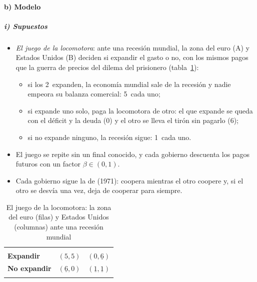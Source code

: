 \documentclass[11pt]{article}
\begin{document}
\paragraph{b) Modelo}
\subparagraph{i) Supuestos}
\begin{itemize}
\item \emph{El juego de la locomotora}\nocite{Frankel2016Coordination}: ante una recesión mundial, la zona del euro (A) y Estados Unidos (B) deciden si expandir el gasto o no, con los mismos pagos que la guerra de precios del dilema del prisionero  (tabla~\ref{tab:locomotora}):
  \begin{itemize}
  \item si los 2~expanden, la economía mundial sale de la recesión y nadie empeora su balanza comercial: 5~cada uno;
  \item si expande uno solo, paga la locomotora de otro: el que expande se queda con el déficit y la deuda (0) y el otro se lleva el tirón sin pagarlo (6);
  \item si no expande ninguno, la recesión sigue: 1~cada uno.
  \end{itemize}
\item El juego se repite sin un final conocido, y cada gobierno descuenta los pagos futuros con un factor $\beta\in(0,1)$.
\item Cada gobierno sigue la  de  (1971)\nocite{Friedman1971Supergames}: coopera mientras el otro coopere y, si el otro se desvía una vez, deja de cooperar para siempre.
\end{itemize}

\begin{table}[H]
\centering
\caption{El juego de la locomotora: la zona del euro (filas) y Estados Unidos (columnas) ante una recesión mundial}\label{tab:locomotora}
\begin{tabular}{>{\centering\arraybackslash}m{2.6cm}|>{\centering\arraybackslash}m{2.6cm}|>{\centering\arraybackslash}m{2.6cm}|}
\multicolumn{1}{c}{} & \multicolumn{1}{c}{\textbf{Expandir}} & \multicolumn{1}{c}{\textbf{No expandir}}\\
\hhline{~|-|-|}
\textbf{Expandir} & $(5,5)$ & $(0,\underline{6})$\\
\hhline{~|-|-|}
\textbf{No expandir} & $(\underline{6},0)$ & \cellcolor{tceesalvia}$(\underline{1},\underline{1})$\\
\hhline{~|-|-|}
\end{tabular}
\end{table}
\end{document}
